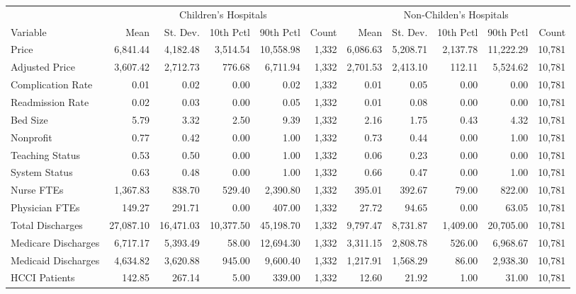 \begin{table}[H]
\centering
\begin{tabular}{lrrrrrrrrrr}
\toprule
\multicolumn{1}{c}{ } & \multicolumn{5}{c}{Children's Hospitals} & \multicolumn{5}{c}{Non-Childen's Hospitals} \\
\cmidrule(l{3pt}r{3pt}){2-6} \cmidrule(l{3pt}r{3pt}){7-11}
Variable & Mean & St. Dev. & 10th Pctl & 90th Pctl & Count & Mean & St. Dev. & 10th Pctl & 90th Pctl & Count\\
\midrule
Price & 6,841.44 & 4,182.48 & 3,514.54 & 10,558.98 & 1,332 & 6,086.63 & 5,208.71 & 2,137.78 & 11,222.29 & 10,781\\
Adjusted Price & 3,607.42 & 2,712.73 & 776.68 & 6,711.94 & 1,332 & 2,701.53 & 2,413.10 & 112.11 & 5,524.62 & 10,781\\
Complication Rate & 0.01 & 0.02 & 0.00 & 0.02 & 1,332 & 0.01 & 0.05 & 0.00 & 0.00 & 10,781\\
Readmission Rate & 0.02 & 0.03 & 0.00 & 0.05 & 1,332 & 0.01 & 0.08 & 0.00 & 0.00 & 10,781\\
Bed Size & 5.79 & 3.32 & 2.50 & 9.39 & 1,332 & 2.16 & 1.75 & 0.43 & 4.32 & 10,781\\
\addlinespace
Nonprofit & 0.77 & 0.42 & 0.00 & 1.00 & 1,332 & 0.73 & 0.44 & 0.00 & 1.00 & 10,781\\
Teaching Status & 0.53 & 0.50 & 0.00 & 1.00 & 1,332 & 0.06 & 0.23 & 0.00 & 0.00 & 10,781\\
System Status & 0.63 & 0.48 & 0.00 & 1.00 & 1,332 & 0.66 & 0.47 & 0.00 & 1.00 & 10,781\\
Nurse FTEs & 1,367.83 & 838.70 & 529.40 & 2,390.80 & 1,332 & 395.01 & 392.67 & 79.00 & 822.00 & 10,781\\
Physician FTEs & 149.27 & 291.71 & 0.00 & 407.00 & 1,332 & 27.72 & 94.65 & 0.00 & 63.05 & 10,781\\
\addlinespace
Total Discharges & 27,087.10 & 16,471.03 & 10,377.50 & 45,198.70 & 1,332 & 9,797.47 & 8,731.87 & 1,409.00 & 20,705.00 & 10,781\\
Medicare Discharges & 6,717.17 & 5,393.49 & 58.00 & 12,694.30 & 1,332 & 3,311.15 & 2,808.78 & 526.00 & 6,968.67 & 10,781\\
Medicaid Discharges & 4,634.82 & 3,620.88 & 945.00 & 9,600.40 & 1,332 & 1,217.91 & 1,568.29 & 86.00 & 2,938.30 & 10,781\\
HCCI Patients & 142.85 & 267.14 & 5.00 & 339.00 & 1,332 & 12.60 & 21.92 & 1.00 & 31.00 & 10,781\\
\bottomrule
\end{tabular}
\end{table}

